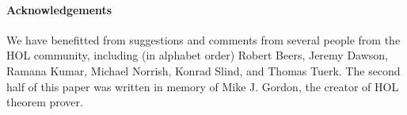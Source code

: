 

\paragraph{Acknowledgements}

We have benefitted from suggestions and comments 
from several people from the HOL
community, including (in alphabet order) Robert Beers, Jeremy Dawson,
Ramana Kumar,
Michael Norrish, 
Konrad Slind, and
Thomas Tuerk.
%
The second half of this
paper was written in memory of Mike J. Gordon, the creator of HOL theorem prover.
